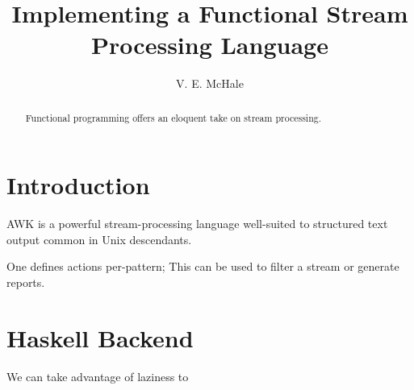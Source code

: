 \documentclass{article}
\begin{document}
\title{Implementing a Functional Stream Processing Language}
\author{V. E. McHale}
\maketitle

\begin{abstract}
  Functional programming offers an eloquent take on stream processing.
\end{abstract}

\section{Introduction}

AWK is a powerful stream-processing language\cite{awkbook} well-suited to structured text output common in Unix descendants.

One defines actions per-pattern;
This can be used to filter a stream or generate reports.

\section{Haskell Backend}

We can take advantage of laziness to





\end{document}
